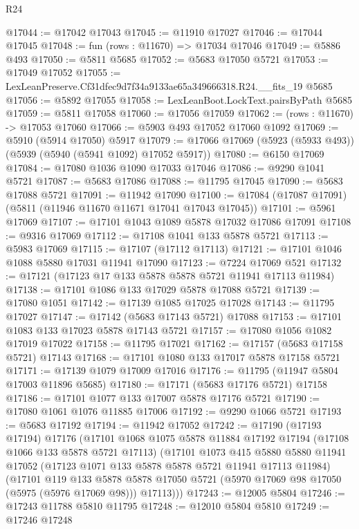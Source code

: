 \begin{lexlean}{R24}
\begin{coremodule}
@17044 := @17042 @17043
@17045 := @11910 @17027
@17046 := @17044 @17045
@17048 := fun (rows : @11670) => @17034 @17046
@17049 := @5886 @493
@17050 := @5811 @5685
@17052 := @5683 @17050 @5721
@17053 := @17049 @17052
@17055 := LexLeanPreserve.Cf31dfec9d7f34a9133ae65a349666318.R24.__fits_19 @5685
@17056 := @5892 @17055
@17058 := LexLeanBoot.LockText.pairsByPath @5685
@17059 := @5811 @17058
@17060 := @17056 @17059
@17062 := (rows : @11670) -> @17053 @17060
@17066 := @5903 @493 @17052 @17060 @1092
@17069 := @5910 (@5914 @17050) @5917
@17079 := @17066 @17069 (@5923 (@5933 @493)) (@5939 (@5940 (@5941 @1092) @17052 @5917))
@17080 := @6150 @17069
@17084 := @17080 @1036 @1090 @17033 @17046
@17086 := @9290 @1041 @5721
@17087 := @5683 @17086
@17088 := @11795 @17045
@17090 := @5683 @17088 @5721
@17091 := @11942 @17090
@17100 := @17084 (@17087 @17091) (@5811 (@11946 @11670 @11671 @17041 @17043 @17045))
@17101 := @5961 @17069
@17107 := @17101 @1043 @1089 @5878 @17032 @17086 @17091
@17108 := @9316 @17069
@17112 := @17108 @1041 @133 @5878 @5721
@17113 := @5983 @17069
@17115 := @17107 (@17112 @17113)
@17121 := @17101 @1046 @1088 @5880 @17031 @11941 @17090
@17123 := @7224 @17069 @521
@17132 := @17121 (@17123 @17 @133 @5878 @5878 @5721 @11941 @17113 @11984)
@17138 := @17101 @1086 @133 @17029 @5878 @17088 @5721
@17139 := @17080 @1051
@17142 := @17139 @1085 @17025 @17028
@17143 := @11795 @17027
@17147 := @17142 (@5683 @17143 @5721) @17088
@17153 := @17101 @1083 @133 @17023 @5878 @17143 @5721
@17157 := @17080 @1056 @1082 @17019 @17022
@17158 := @11795 @17021
@17162 := @17157 (@5683 @17158 @5721) @17143
@17168 := @17101 @1080 @133 @17017 @5878 @17158 @5721
@17171 := @17139 @1079 @17009 @17016
@17176 := @11795 (@11947 @5804 @17003 @11896 @5685)
@17180 := @17171 (@5683 @17176 @5721) @17158
@17186 := @17101 @1077 @133 @17007 @5878 @17176 @5721
@17190 := @17080 @1061 @1076 @11885 @17006
@17192 := @9290 @1066 @5721
@17193 := @5683 @17192
@17194 := @11942 @17052
@17242 := @17190
    (@17193 @17194)
    @17176
    (@17101
      @1068
      @1075
      @5878
      @11884
      @17192
      @17194
      (@17108 @1066 @133 @5878 @5721 @17113)
      (@17101
        @1073
        @415
        @5880
        @5880
        @11941
        @17052
        (@17123 @1071 @133 @5878 @5878 @5721 @11941 @17113 @11984)
        (@17101
          @119
          @133
          @5878
          @5878
          @17050
          @5721
          (@5970 @17069 @98 @17050 (@5975 (@5976 @17069 @98)))
          @17113)))
@17243 := @12005 @5804
@17246 := @17243 @11788 @5810 @11795
@17248 := @12010 @5804 @5810
@17249 := @17246 @17248

\end{coremodule}
\end{lexlean}

